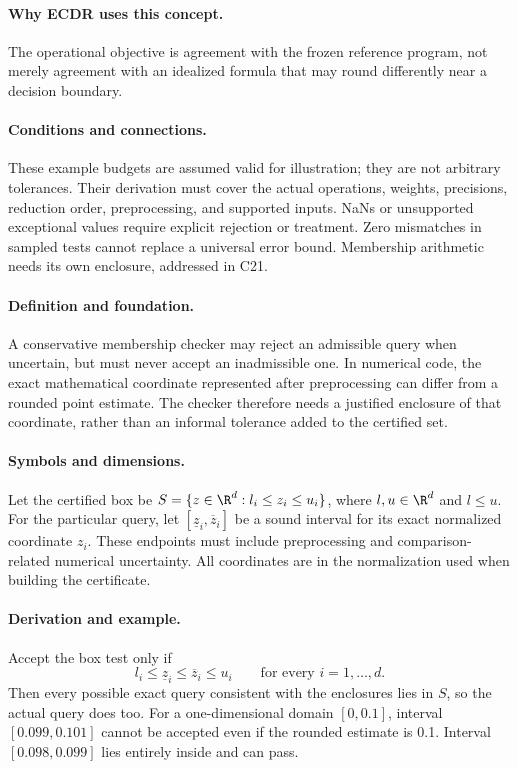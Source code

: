 \paragraph{Why ECDR uses this concept.}
The operational objective is agreement with the frozen reference program, not merely agreement with an idealized formula that may round differently near a decision boundary.
\paragraph{Conditions and connections.}
These example budgets are assumed valid for illustration; they are not arbitrary tolerances. Their derivation must cover the actual operations, weights, precisions, reduction order, preprocessing, and supported inputs. NaNs or unsupported exceptional values require explicit rejection or treatment. Zero mismatches in sampled tests cannot replace a universal error bound. Membership arithmetic needs its own enclosure, addressed in C21.

\paragraph{Definition and foundation.}
A conservative membership checker may reject an admissible query when uncertain, but must never accept an inadmissible one. In numerical code, the exact mathematical coordinate represented after preprocessing can differ from a rounded point estimate. The checker therefore needs a justified enclosure of that coordinate, rather than an informal tolerance added to the certified set.
\paragraph{Symbols and dimensions.}
Let the certified box be $S=\{z\in\R^d:l_i\le z_i\le u_i\}$, where $l,u\in\R^d$ and $l\le u$. For the particular query, let $[\underline z_i,\overline z_i]$ be a sound interval for its exact normalized coordinate $z_i$. These endpoints must include preprocessing and comparison-related numerical uncertainty. All coordinates are in the normalization used when building the certificate.
\paragraph{Derivation and example.}
Accept the box test only if
\[
 l_i\le\underline z_i\le\overline z_i\le u_i
 \qquad\text{for every }i=1,\ldots,d.
\]
Then every possible exact query consistent with the enclosures lies in $S$, so the actual query does too. For a one-dimensional domain $[0,0.1]$, interval $[0.099,0.101]$ cannot be accepted even if the rounded estimate is 0.1. Interval $[0.098,0.099]$ lies entirely inside and can pass.
